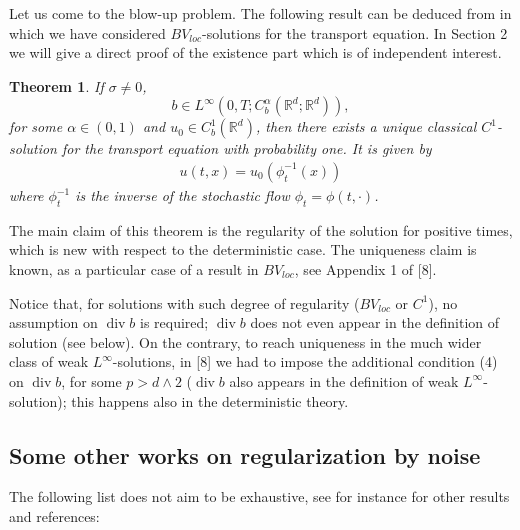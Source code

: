 \documentclass{article}
\newtheorem{theorem}{Theorem}
\begin{document}
Let us come to the blow-up problem.
The following result can be deduced from  \cite[Appendix A]{FGP} in which we
have considered $BV_{loc}$-solutions  for the transport equation. In Section 2
we will give a direct proof of  the existence part which is of independent interest.

\begin{theorem}
\label{thmnoblowup}If $\sigma\neq0$,%
\[
b\in L^{\infty}(  0,T ;C_{b}^{\alpha}(  \mathbb{R}^{d}%
;\mathbb{R}^{d})  ) ,
\]
for some $\alpha\in\left(  0,1\right)  $ and $u_{0}\in C^{1}_{b}\left(
\mathbb{R}^{d}\right)  $, then there exists a unique classical $C^{1}%
$-solution for the transport equation with probability one. It is given by
\begin{align}
\label{df1}u\left(  t,x\right)  =u_{0}\left(  \phi_{t}^{-1}\left(  x\right)
\right)
\end{align}
where $\phi_{t}^{-1}$ is the inverse of the stochastic flow $\phi_{t}%
=\phi\left(  t,\cdot\right)  $.
\end{theorem}

The main claim of this theorem is the regularity of the solution for positive
times, which is new with respect to the deterministic case. The uniqueness
claim is known, as a particular case of a result in $BV_{loc}$, see Appendix 1
of [8].

Notice that, for solutions with such degree of regularity ($BV_{loc}$ or
$C^{1}$), no assumption on $\operatorname{div}b$ is required;
$\operatorname{div}b$ does not even appear in the definition of solution (see
below). On the contrary, to reach uniqueness in the much wider class of weak
$L^{\infty}$-solutions, in [8] we had to impose the additional condition (4)
on $\operatorname{div}b$, for some $p>d\wedge2$ ($\operatorname{div}b$ also
appears in the definition of weak $L^{\infty}$-solution); this happens also in
the deterministic theory.



\subsection{Some other works on regularization by noise}

The following list does not aim to be exhaustive, see for instance \cite{Fla} for other
results and references:
\end{document}
